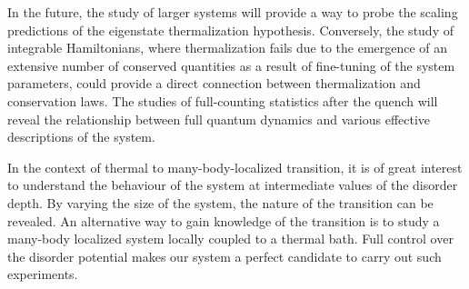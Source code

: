 In the future, the study of larger systems will provide a way to probe the scaling predictions of the eigenstate thermalization hypothesis. Conversely, the study of integrable Hamiltonians, where thermalization fails due to the emergence of an extensive number of conserved quantities as a result of fine-tuning of the system parameters, could provide a direct connection between thermalization and conservation laws. The studies of full-counting statistics after the quench will reveal the relationship between full quantum dynamics and various effective descriptions of the system.

In the context of thermal to many-body-localized transition, it is of great interest to understand the behaviour of the system at intermediate values of the disorder depth. By varying the size of the system, the nature of the transition can be revealed. An alternative way to gain knowledge of the transition is to study a many-body localized system locally coupled to a thermal bath. Full control over the disorder potential makes our system a perfect candidate to carry out such experiments.
